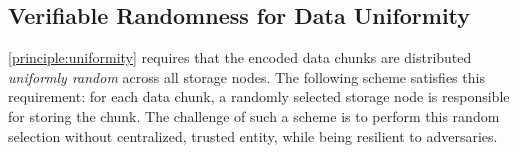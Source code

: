 \subsection{Verifiable Randomness for Data Uniformity}
\label{sec:approach:random}


\autoref{principle:uniformity} requires that the encoded data chunks are distributed \emph{uniformly random} across all storage nodes.
The following scheme satisfies this requirement: for each data chunk, a randomly selected storage node is responsible for storing the chunk.
The challenge of such a scheme is to perform this random selection without centralized, trusted entity, while being resilient to adversaries.

